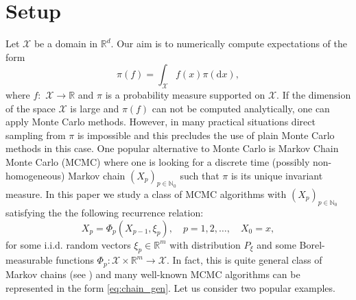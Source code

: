 \documentclass[bj]{imsart}
\def\nset{\mathbb{N}}
\def\rmd{\mathrm{d}}
\begin{document}
\section{Setup}\label{sec:setup}
Let  \(\mathcal{X}\) be a domain in \( \mathbb{R}^d.\)  Our aim is to numerically compute  expectations of the form
\[
\pi(f)=\int_{\mathcal{X}} f(x)\pi(\rmd x),
\]
where \(f:\) \(\mathcal{X}\longrightarrow \mathbb{R}\) and \(\pi\) is a probability measure supported on \(\mathcal{X}.\)
If  the dimension of the space \(\mathcal{X}\) is large and \(\pi(f)\) can not be computed analytically, one can apply Monte Carlo methods. However, in many practical situations  direct sampling from \(\pi\) is impossible and this precludes the use of plain Monte Carlo methods in this case. One popular alternative to Monte Carlo  is Markov Chain Monte Carlo (MCMC) where one is looking for a discrete time  (possibly non-homogeneous) Markov chain   \((X_p)_{p \in \nset_0}\) such that \(\pi\) is its unique invariant measure. In this paper we study a class of MCMC algorithms with \((X_p)_{p \in \nset_0}\) satisfying the  the following recurrence relation:
\begin{equation}
\label{eq:chain_gen}
X_{p}=\Phi_{p}(X_{p-1},\xi_{p}),\quad p=1,2,\ldots ,\quad X_{0}=x,
\end{equation}
for some i.i.d.  random vectors \(\xi_p\in \mathbb{R}^m\) with distribution \(P_{\xi}\)
and some Borel-measurable
functions $\Phi_{p}\colon\mathcal{X}\times\mathbb{R}^{m}\to\mathcal{X}.$
In fact, this is quite general class of Markov chains (see \cite[Theorem~1.3.6]{moulines2018})
and many well-known MCMC algorithms can be represented in the form \eqref{eq:chain_gen}.
Let us consider two popular examples.
\end{document}
